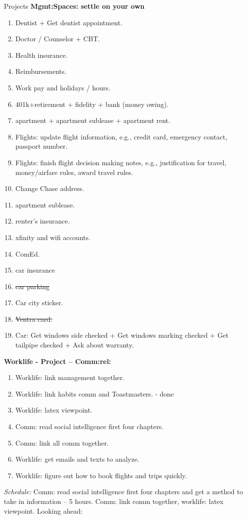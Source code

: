 \documentclass[serif, mathserif, final]{beamer}
\newcommand{\doneTask}[1]{\tiny \item \tiny \sout{#1}}
\begin{document}
\begin{frame}
\begin{columns}
\begin{block}{Projects}
{\bf Mgmt:Spaces: settle on your own} 
\begin{enumerate}
\item \tiny Dentist + Get dentist appointment.
\item \tiny Doctor / Counselor + CBT.
\item \tiny Health insurance.
\item \tiny Reimbursements.
\item \tiny Work pay and holidays / hours. 
\item \tiny 401k+retirement  + fidelity + bank (money owing). 
\item \tiny apartment + apartment sublease + apartment rent.
\item \tiny Flights: update flight information, e.g., credit card,
  emergency contact, passport number.
\item \tiny Flights: finish flight decision making notes, e.g.,
  justification for travel, money/airfare rules, award travel rules. 

\item \tiny Change Chase address. 
\item \tiny apartment sublease. 
\item \tiny renter's insurance. 
\item \tiny xfinity and wifi accounts. 
\item \tiny ComEd. 
\item \tiny car insurance 
\doneTask{car parking} 
\item \tiny Car city sticker. 
\doneTask{Ventra card.}
\item \tiny Car: Get windows side checked + Get windows marking checked + Get tailpipe checked + Ask about warranty. 
\end{enumerate} 

{\bf Worklife - Project – Comm:rel: } 
\begin{enumerate} 
\tiny \item \tiny Worklife: link management together.  
\item \tiny Worklife: link habits comm and Toastmasters. - done
\item \tiny Worklife: latex viewpoint. 
\item \tiny Comm: read social intelligence first four chapters.
\item \tiny Comm: link all comm together.
\item \tiny Worklife: get emails and texts to analyze. 
\item \tiny Worklife: figure out how to book flights and trips quickly. 
\end{enumerate}
\textit{Schedule:} Comm: read social intelligence first four chapters
and get a method to take in information – 5 hours. 
Comm: link comm together, worklife: latex viewpoint. Looking ahead:  



\end{block}
\end{columns}
\end{frame}
\end{document}
